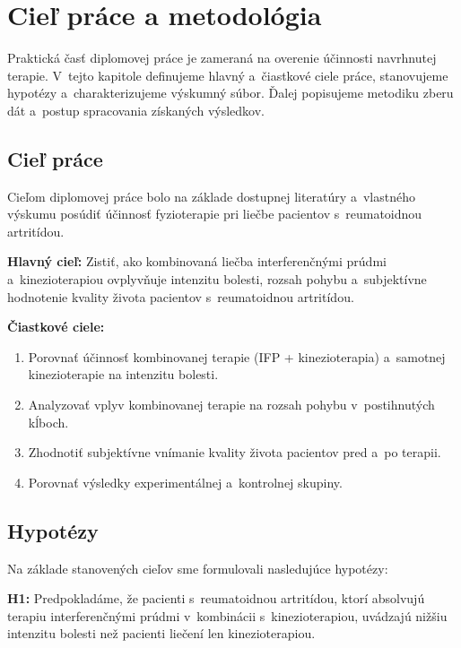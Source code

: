 
\chapter{Cieľ práce a metodológia}

Praktická časť diplomovej práce je zameraná na overenie účinnosti navrhnutej terapie. V~tejto kapitole definujeme hlavný a~čiastkové ciele práce, stanovujeme hypotézy a~charakterizujeme výskumný súbor. Ďalej popisujeme metodiku zberu dát a~postup spracovania získaných výsledkov.

\section{Cieľ práce}

Cieľom diplomovej práce bolo na základe dostupnej literatúry a~vlastného výskumu posúdiť účinnosť fyzioterapie pri liečbe pacientov s~reumatoidnou artritídou.

\textbf{Hlavný cieľ:}
Zistiť, ako kombinovaná liečba interferenčnými prúdmi a~kinezioterapiou ovplyvňuje intenzitu bolesti, rozsah pohybu a~subjektívne hodnotenie kvality života pacientov s~reumatoidnou artritídou.

\textbf{Čiastkové ciele:}
\begin{enumerate}
    \item Porovnať účinnosť kombinovanej terapie (IFP + kinezioterapia) a~samotnej kinezioterapie na intenzitu bolesti.
    \item Analyzovať vplyv kombinovanej terapie na rozsah pohybu v~postihnutých kĺboch.
    \item Zhodnotiť subjektívne vnímanie kvality života pacientov pred a~po terapii.
    \item Porovnať výsledky experimentálnej a~kontrolnej skupiny.
\end{enumerate}

\section{Hypotézy}

Na základe stanovených cieľov sme formulovali nasledujúce hypotézy:

\textbf{H1:} Predpokladáme, že pacienti s~reumatoidnou artritídou, ktorí absolvujú terapiu interferenčnými prúdmi v~kombinácii s~kinezioterapiou, uvádzajú nižšiu intenzitu bolesti než pacienti liečení len kinezioterapiou.

